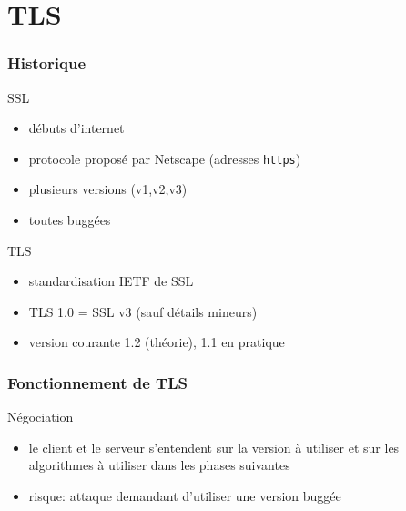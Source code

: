 \begin{reveals}
\begin{frame}
  \vfill

\end{frame}






\section{TLS}

\begin{frame}
  \frametitle{Historique}

  \vfill

   \begin{block}{SSL}
     \begin{itemize}
     \item débuts d'internet
     \item protocole proposé par Netscape (adresses \texttt{https})
     \item plusieurs versions (v1,v2,v3)
     \item toutes buggées
     \end{itemize}
   \end{block}

  \vfill
  \begin{block}{TLS}
    \begin{itemize}
    \item standardisation IETF de SSL
    \item TLS 1.0 = SSL v3 (sauf détails mineurs)
    \item version courante 1.2 (théorie), 1.1 en pratique
    \end{itemize}
  \end{block}

  \vfill
\end{frame}

\begin{frame}
  \frametitle{Fonctionnement de TLS}

  \vfill

   \begin{block}{Négociation}
     \begin{itemize}
     \item le client et le serveur s'entendent sur la version à utiliser
     et  sur les algorithmes à utiliser dans les phases suivantes
     \item risque: attaque demandant d'utiliser une version buggée
     \end{itemize}
  \end{block}


\end{frame}
\end{reveals}
